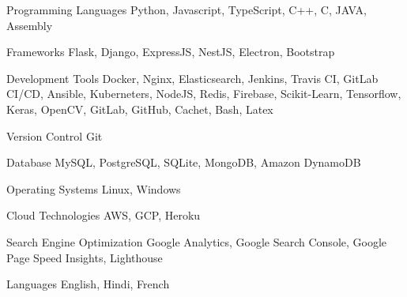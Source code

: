

\begin{cvskills}

  \cvskill
    {Programming Languages} %
    {Python, Javascript, TypeScript, C++, C, JAVA, Assembly} %
    
  \cvskill
    {Frameworks} %
    {Flask, Django, ExpressJS, NestJS, Electron, Bootstrap} %

  \cvskill
    {Development Tools} %
    {Docker, Nginx, Elasticsearch, Jenkins, Travis CI, GitLab CI/CD, Ansible, Kuberneters, NodeJS, Redis, Firebase, Scikit-Learn, Tensorflow, Keras, OpenCV, GitLab, GitHub, Cachet, Bash, Latex} %
    
  \cvskill
    {Version Control} %
    {Git} %
    
  \cvskill
    {Database} %
    {MySQL, PostgreSQL, SQLite, MongoDB, Amazon DynamoDB} %

  \cvskill
    {Operating Systems} %
    {Linux, Windows} %

  \cvskill
    {Cloud Technologies} %
    {AWS, GCP, Heroku} %

  \cvskill
    {Search Engine Optimization} %
    {Google Analytics, Google Search Console, Google Page Speed Insights, Lighthouse} %
    
  \cvskill
    {Languages} %
    {English, Hindi, French} %

\end{cvskills}
